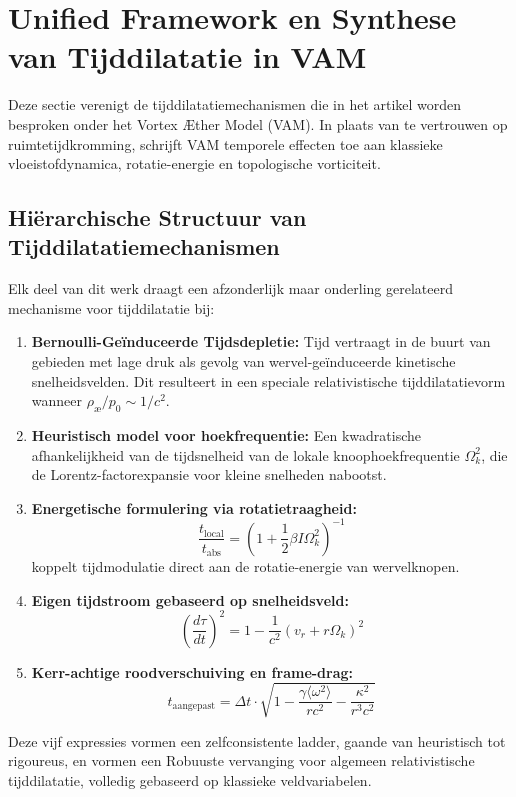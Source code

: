 \section{Unified Framework en Synthese van Tijddilatatie in VAM}

Deze sectie verenigt de tijddilatatiemechanismen die in het artikel worden besproken onder het Vortex Æther Model (VAM). In plaats van te vertrouwen op ruimtetijdkromming, schrijft VAM temporele effecten toe aan klassieke vloeistofdynamica, rotatie-energie en topologische vorticiteit.

\subsection{Hiërarchische Structuur van Tijddilatatiemechanismen}

Elk deel van dit werk draagt een afzonderlijk maar onderling gerelateerd mechanisme voor tijddilatatie bij:

\begin{enumerate}
\item \textbf{Bernoulli-Geïnduceerde Tijdsdepletie:} Tijd vertraagt in de buurt van gebieden met lage druk als gevolg van wervel-geïnduceerde kinetische snelheidsvelden. Dit resulteert in een speciale relativistische tijddilatatievorm wanneer \( \rho_\text{\ae} / p_0 \sim 1/c^2 \).
\item \textbf{Heuristisch model voor hoekfrequentie:} Een kwadratische afhankelijkheid van de tijdsnelheid van de lokale knoophoekfrequentie \( \Omega_k^2 \), die de Lorentz-factorexpansie voor kleine snelheden nabootst.
\item \textbf{Energetische formulering via rotatietraagheid:}
\[
\boxed{\frac{t_\text{local}}{t_\text{abs}} = \left(1 + \frac{1}{2} \beta I \Omega_k^2 \right)^{-1}}
\]
koppelt tijdmodulatie direct aan de rotatie-energie van wervelknopen. \item \textbf{Eigen tijdstroom gebaseerd op snelheidsveld:}
\[
\boxed{\left( \frac{d\tau}{dt} \right)^2 = 1 - \frac{1}{c^2}(v_r + r\Omega_k)^2}
\]
\item \textbf{Kerr-achtige roodverschuiving en frame-drag:}
\[
\boxed{t_\text{aangepast} = \Delta t \cdot \sqrt{1 - \frac{\gamma \langle \omega^2 \rangle}{rc^2} - \frac{\kappa^2}{r^3c^2}}}
\]
\end{enumerate}

Deze vijf expressies vormen een zelfconsistente ladder, gaande van heuristisch tot rigoureus, en vormen een Robuuste vervanging voor algemeen relativistische tijddilatatie, volledig gebaseerd op klassieke veldvariabelen.

